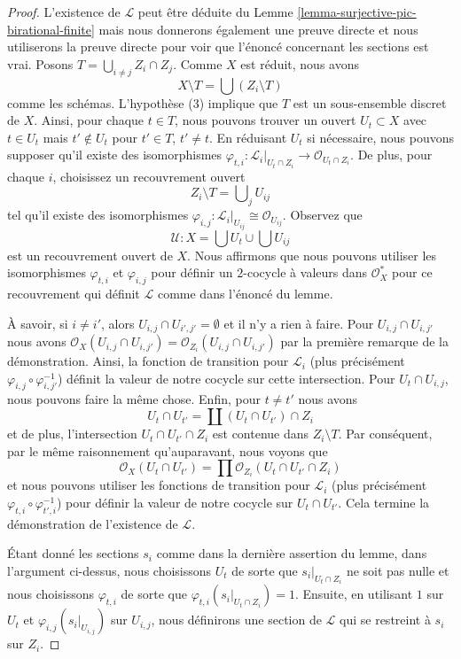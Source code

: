 \begin{proof}
L'existence de $\mathcal{L}$ peut être déduite du Lemme
\ref{lemma-surjective-pic-birational-finite} mais nous donnerons
également une preuve directe et nous utiliserons la preuve directe
pour voir que l'énoncé concernant les sections est vrai. Posons $T =
\bigcup_{i \not = j} Z_i \cap Z_j$. Comme $X$ est réduit, nous avons
$$
X \setminus T = \bigcup (Z_i \setminus T)
$$
comme les schémas. L'hypothèse (3) implique que $T$ est un sous-ensemble
discret de $X$. Ainsi, pour chaque $t \in T$, nous pouvons trouver un ouvert
$U_t \subset X$ avec $t \in U_t$ mais $t' \not \in U_t$ pour $t' \in T$, $t'
\not = t$. En réduisant $U_t$ si nécessaire, nous pouvons supposer qu'il existe
des isomorphismes $\varphi_{t, i} : \mathcal{L}_i|_{U_t \cap Z_i} \to
\mathcal{O}_{U_t \cap Z_i}$. De plus, pour chaque $i$, choisissez un recouvrement ouvert
$$
Z_i \setminus T = \bigcup\nolimits_j U_{ij}
$$
tel qu'il existe des isomorphismes
$\varphi_{i, j} : \mathcal{L}_i|_{U_{ij}}
\cong \mathcal{O}_{U_{ij}}$. Observez que
$$
\mathcal{U} : X = \bigcup U_t \cup \bigcup U_{ij}
$$
est un recouvrement ouvert de $X$. Nous affirmons que nous pouvons
utiliser les isomorphismes $\varphi_{t, i}$ et $\varphi_{i, j}$
pour définir un $2$-cocycle à valeurs dans $\mathcal{O}_X^*$ pour ce
recouvrement qui définit $\mathcal{L}$ comme dans l’énoncé du lemme.

\medskip\noindent
À savoir, si $i \not = i'$, alors $U_{i, j} \cap U_{i', j'}
= \emptyset$ et il n'y a rien à faire. Pour $U_{i, j} \cap
U_{i, j'}$ nous avons $\mathcal{O}_X(U_{i, j} \cap U_{i, j'})
= \mathcal{O}_{Z_i}(U_{i, j} \cap U_{i, j'})$ par la
première remarque de la démonstration. Ainsi, la fonction de
transition pour $\mathcal{L}_i$ (plus précisément $\varphi_{i,
j} \circ \varphi_{i, j'}^{-1}$) définit la valeur de notre
cocycle sur cette intersection. Pour $U_t \cap U_{i, j}$, nous
pouvons faire la même chose. Enfin, pour $t \not = t'$ nous avons
$$
U_t \cap U_{t'} = \coprod (U_t \cap U_{t'}) \cap Z_i
$$
et de plus, l'intersection $U_t \cap U_{t'} \cap Z_i$ est contenue dans $Z_i
\setminus T$. Par conséquent, par le même raisonnement qu'auparavant, nous voyons que
$$
\mathcal{O}_X(U_t \cap U_{t'}) =
\prod \mathcal{O}_{Z_i}(U_t \cap U_{t'} \cap Z_i)
$$
et nous pouvons utiliser les fonctions de transition pour
$\mathcal{L}_i$ (plus précisément $\varphi_{t, i} \circ \varphi_{t',
i}^{-1}$) pour définir la valeur de notre cocycle sur $U_t \cap
U_{t'}$. Cela termine la démonstration de l'existence de $\mathcal{L}$.

\medskip\noindent
Étant donné les sections $s_i$ comme dans la dernière assertion du lemme,
dans l'argument ci-dessus, nous choisissons $U_t$ de sorte que $s_i|_{U_t
\cap Z_i}$ ne soit pas nulle et nous choisissons $\varphi_{t, i}$ de
sorte que $\varphi_{t, i}(s_i|_{U_t \cap Z_i}) = 1$. Ensuite, en utilisant
$1$ sur $U_t$ et $\varphi_{i, j}(s_i|_{U_{i, j}})$ sur $U_{i, j}$, nous
définirons une section de $\mathcal{L}$ qui se restreint à $s_i$ sur $Z_i$.
\end{proof}

